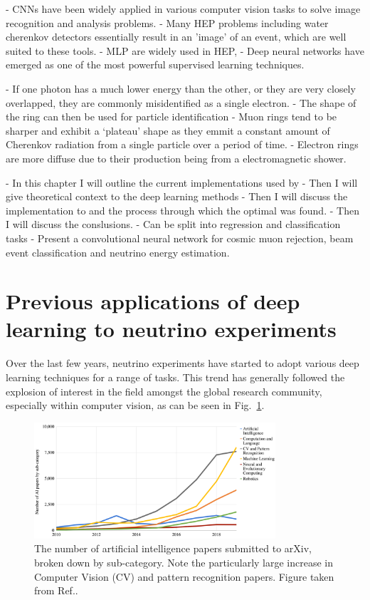 - CNNs have been widely applied in various computer vision tasks to solve image recognition and
analysis problems.
- Many HEP problems including water cherenkov detectors essentially result in an 'image' of an
event, which are well suited to these tools.
- MLP are widely used in HEP,
- Deep neural networks have emerged as one of the most powerful supervised learning techniques.

- If one photon has a much lower energy than the other, or they are very closely overlapped,
they are commonly misidentified as a single electron.
- The shape of the ring can then be used for particle identification
- Muon rings tend to be sharper and exhibit a `plateau' shape as they emmit a constant amount of
Cherenkov radiation from a single particle over a period of time.
- Electron rings are more diffuse due to their production being from a electromagnetic shower.

- In this chapter I will outline the current implementations used by \chips
- Then I will give theoretical context to the deep learning methods
- Then I will discuss the implementation to \chips and the process through which the optimal
was found.
- Then I will discuss the conslusions.
- Can be split into regression and classification tasks
- Present a convolutional neural network for cosmic muon rejection, beam event classification and
neutrino energy estimation.

\section{Previous applications of deep learning to neutrino experiments} %
\label{sec:cvn_previous} %

Over the last few years, neutrino experiments have started to adopt various deep learning
techniques for a range of tasks. This trend has generally followed the explosion of interest in
the field amongst the global research community, especially within computer vision, as can be seen
in Fig.~\ref{fig:papers}.

\begin{figure} %
    \includegraphics[width=0.8\textwidth]{diagrams/7-cvn/papers.png}
    \caption[papers short]
    {The number of artificial intelligence papers submitted to arXiv, broken down by sub-category.
        Note the particularly large increase in Computer Vision (CV) and pattern recognition
        papers. Figure taken from Ref.\cite{perrault2019}.}
    \label{fig:papers}
\end{figure}

